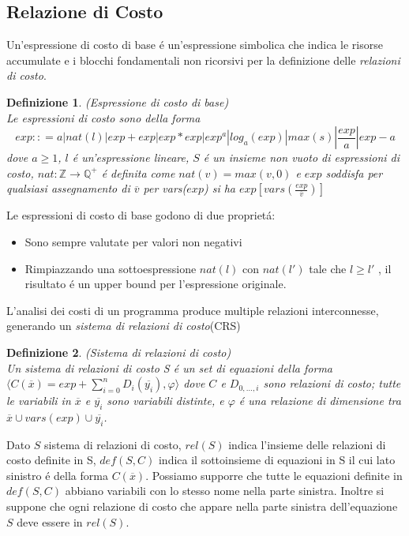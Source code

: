 \documentclass[../../main.tex]{subfiles}
\begin{document}
\subsection{Relazione di Costo} 
Un'espressione di costo di base é un'espressione simbolica che indica le risorse accumulate e i blocchi fondamentali non ricorsivi per la definizione delle \textit{relazioni di costo}.
\newtheorem{definition}{Definizione}
\begin{definition}(Espressione di costo di base)\\
Le espressioni di costo sono della forma $$exp :: = a | nat(l) | exp + exp | exp * exp |exp^a |log _a (exp) | max(s) | \frac{exp}{a} | exp - a   $$
dove $a \geq 1$, $l$ é un'espressione lineare, $S$ é un insieme non vuoto di espressioni di costo, $nat : \mathbb{Z}  \rightarrow \mathbb{Q} ^+$ é definita come $nat(v) = max({v,0})$ e $exp$ soddisfa per qualsiasi assegnamento di $\overline{v}$ per vars($exp$) si ha $exp[ vars(\frac{exp}{\overline{v}})]$
\end{definition}

Le espressioni di costo di base godono di due proprietá:
\begin{itemize}
    \item Sono sempre valutate per valori non negativi
    \item Rimpiazzando una sottoespressione $nat(l)$ con $nat(l')$ tale che $l \geq l'$ , il risultato é un upper bound per l'espressione originale.
\end{itemize}
L'analisi dei costi di un programma produce multiple relazioni interconnesse, generando un \textit{sistema di relazioni di costo}(CRS)

\begin{definition}(Sistema di relazioni di costo)\\
    Un sistema di relazioni di costo S é un set di equazioni della forma $\langle C(\overline{x}) = exp + \sum_{i = 0}^n D_i(\overline{y_i}), \varphi \rangle$  dove $C$ e $D_{0,\dots, i}$ sono relazioni di costo; tutte le variabili in $\overline{x}$ e $\overline{y_i}$ sono variabili distinte, e $\varphi$ é una relazione di dimensione tra  $\overline{x} \cup vars(exp) \cup \overline{y_i}$.
\end{definition}

Dato $S$ sistema di relazioni di costo, $rel(S)$ indica l'insieme delle relazioni di costo definite in S, $def(S,C)$ indica il sottoinsieme di equazioni in S il cui lato sinistro é della forma $C(\overline{x})$.
Possiamo supporre che tutte le equazioni definite in $def(S,C)$ abbiano variabili con lo stesso nome nella parte sinistra.
Inoltre si suppone che ogni relazione di costo che appare nella parte sinistra dell'equazione $S$ deve essere in $rel(S)$.
\end{document}
